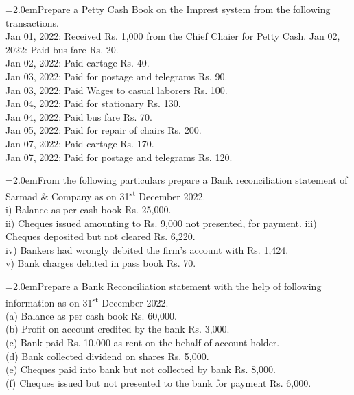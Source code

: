 \documentclass[11pt,a4paper]{article}
\newcommand{\lqn}[2]{\Needspace{6\baselineskip}\par\medskip\noindent\hangindent=2.0em\hangafter=1\makebox[2.0em][l]{\textbf{#1.}}#2\par}
\begin{document}
\lqn{64}{Prepare a Petty Cash Book on the Imprest system from the following transactions.\\
Jan 01, 2022:    Received Rs. 1,000 from the Chief Chaier for Petty Cash. Jan 02, 2022:    Paid bus fare Rs. 20.\\
Jan 02, 2022:    Paid cartage Rs. 40.\\
Jan 03, 2022:    Paid for postage and telegrams Rs. 90.\\
Jan 03, 2022:    Paid Wages to casual laborers Rs. 100.\\
Jan 04, 2022:    Paid for stationary Rs. 130.\\
Jan 04, 2022:    Paid bus fare Rs. 70.\\
Jan 05, 2022:    Paid for repair of chairs Rs. 200.\\
Jan 07, 2022:    Paid cartage Rs. 170.\\
Jan 07, 2022:    Paid for postage and telegrams Rs. 120.\par
}
\lqn{65}{From the following particulars prepare a Bank reconciliation statement of Sarmad \& Company as on 31\textsuperscript{st}  December 2022.\\
i) Balance as per cash book Rs. 25,000.\\
ii) Cheques issued amounting to Rs. 9,000 not presented, for payment. iii) Cheques deposited but not cleared Rs. 6,220.\\
iv) Bankers had wrongly debited the firm’s account with Rs. 1,424.\\
v) Bank charges debited in pass book Rs. 70.\par
}
\lqn{66}{Prepare a Bank Reconciliation statement with the help of following information as on 31\textsuperscript{st}  December 2022.\\
(a) Balance as per cash book Rs. 60,000.\\
(b) Profit on account credited by the bank Rs. 3,000.\\
(c) Bank paid Rs. 10,000 as rent on the behalf of account-holder.\\
(d) Bank collected dividend on shares Rs. 5,000.\\
(e) Cheques paid into bank but not collected by bank Rs. 8,000.\\
(f) Cheques issued but not presented to the bank for payment Rs. 6,000.\par
}
\end{document}
